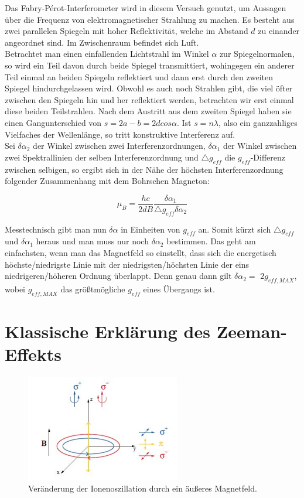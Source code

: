 \documentclass[bigchapter,colorback,accentcolor=tud4b,linedtoc,11pt]{tudreport}
\begin{document}
Das Fabry-Pérot-Interferometer wird in diesem Versuch genutzt, um
Aussagen über die Frequenz von elektromagnetischer Strahlung zu machen.
Es besteht aus zwei parallelen Spiegeln mit hoher Reflektivität, welche
im Abstand $d$ zu einander angeordnet sind. Im Zwischenraum befindet
sich Luft. \\
Betrachtet man einen einfallenden Lichtstrahl im Winkel $\alpha$ zur
Spiegelnormalen, so wird ein Teil davon durch beide Spiegel transmittiert,
wohingegen ein anderer Teil einmal an beiden Spiegeln reflektiert
und dann erst durch den zweiten Spiegel hindurchgelassen wird. Obwohl
es auch noch Strahlen gibt, die viel öfter zwischen den Spiegeln hin
und her reflektiert werden, betrachten wir erst einmal diese beiden
Teilstrahlen. Nach dem Austritt aus dem zweiten Spiegel haben sie
einen Gangunterschied von $s=2a-b=2dcos\alpha$. Ist $s=n\lambda$,
also ein ganzzahliges Vielfaches der Wellenlänge, so tritt konstruktive
Interferenz auf. \\
Sei $\delta\alpha_{2}$ der Winkel zwischen zwei Interferenzordnungen,
$\delta\alpha_{1}$ der Winkel zwischen zwei Spektrallinien der selben
Interferenzordnung und $\triangle g_{eff}$ die $g_{eff}$-Differenz
zwischen selbigen, so ergibt sich in der Nähe der höchsten Interferenzordnung
folgender Zusammenhang mit dem Bohrschen Magneton:

$$\mu_{B}=\frac{hc}{2dB}\frac{\delta\alpha_{1}}{\triangle g_{eff}\delta\alpha_{2}}$$

Messtechnisch gibt man nun $\delta\alpha$ in Einheiten von $g_{eff}$
an. Somit kürzt sich $\triangle g_{eff}$ und $\delta\alpha_{1}$
heraus und man muss nur noch $\delta\alpha_{2}$ bestimmen. Das geht
am einfachsten, wenn man das Magnetfeld so einstellt, dass sich die
energetisch höchste/niedrigste Linie mit der niedrigsten/höchsten
Linie der eins niedrigeren/höheren Ordnung überlappt. Denn genau dann
gilt $\delta\alpha_{2}=$ $2g_{eff,MAX}$, wobei $g_{eff,MAX}$ das
größtmögliche $g_{eff}$ eines Übergangs ist. 


\section{Klassische Erklärung des Zeeman-Effekts}

\begin{figure}[H] 
  \centering
     \includegraphics[width=0.6\textwidth]{data/Zerlegung.jpg}
  \caption{Veränderung der Ionenoszillation durch ein äußeres Magnetfeld.}
  \label{fig:Bild1}
\end{figure}
\end{document}

